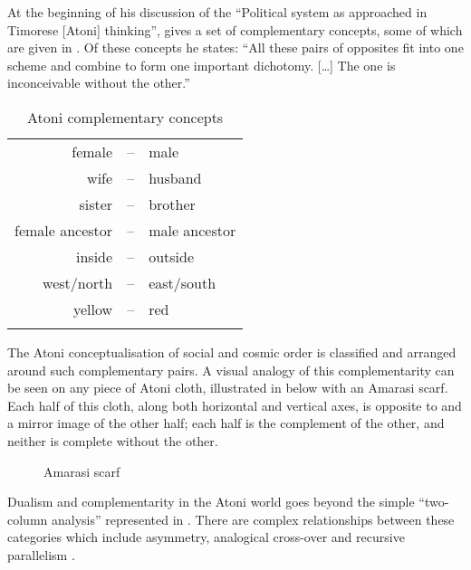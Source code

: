 At the beginning of his discussion of the
``Political system as approached in Timorese [Atoni] thinking'',
\citet[408]{scno71} gives a set of complementary concepts,
some of which are given in .
Of these concepts he states:
``All these pairs of opposites fit into one scheme and combine to form one important dichotomy.
[\ldots] The one is inconceivable without the other.''

\begin{table}[h]
	\caption[Atoni complementary concepts]{Atoni complementary concepts \citep[408]{scno71}}\label{tab:AtoParCon}
	\centering
		\begin{tabular}{rcl} \lsptoprule
			female 		&--& male\\
			wife			&--& husband\\
			sister 		&--& brother\\
			female ancestor	&--&male ancestor\\
			inside		&--&outside\\
			west/north&--&east/south\\
			yellow		&--&red\\
		\lspbottomrule
		\end{tabular}
\end{table}

The Atoni conceptualisation of social and cosmic order
is classified and arranged around such complementary pairs.
A visual analogy of this complementarity can be seen on any piece of Atoni cloth,
illustrated in  below with an Amarasi scarf.
Each half of this cloth, along both horizontal and vertical axes,
is opposite to and a mirror image of the other half;
each half is the complement of the other, and neither is complete without the other.

\begin{figure}[h]\setlength\fboxsep{-0.5pt}\setlength\fboxrule{0.75pt}
	\caption{Amarasi scarf}\label{fig:AmaSca}
\end{figure}

Dualism and complementarity in the Atoni world
goes beyond the simple ``two-column analysis'' represented in .
There are complex relationships between these categories which
include asymmetry, analogical cross-over and recursive parallelism \citep{fo89}.

